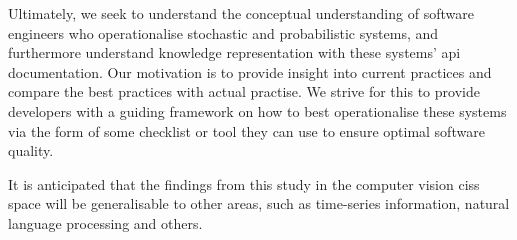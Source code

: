 Ultimately, we seek to understand the conceptual understanding of software engineers who operationalise stochastic and probabilistic systems, and furthermore understand knowledge representation with these systems' \gls{api} documentation. Our motivation is to provide insight into current practices and compare the best practices with actual practise. We strive for this to  provide developers with a guiding framework on how to best operationalise these systems via the form of some checklist or tool they can use to ensure optimal software quality.

It is anticipated that the findings from this study in the computer vision \glspl{cis} space will be generalisable to other areas, such as time-series information, natural language processing and others.

